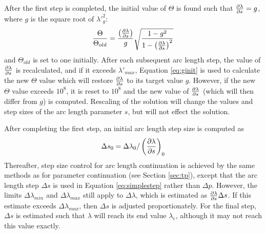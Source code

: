After the first step is completed, the initial value of $\Theta$ is found such that $\frac{\partial \lambda}{\partial s} = g$, where $g$ is the square root of $\lambda'^2_g$:
\begin{equation}
\label{eq:ginit}
{{\Theta}\over {\Theta_{old}}} = {{\left( \frac{\partial \lambda}{\partial s} \right)}\over {g}} \sqrt{{1 - g^2}\over {1 - \left( \frac{\partial \lambda}{\partial s} \right)^2}}
\end{equation}
and $\Theta_{old}$ is set to one initially. After each subsequent arc length step, the value of $\frac{\partial \lambda}{\partial s}$ is recalculated, and if it exceeds $\lambda'_{max}$, Equation \ref{eq:ginit} is used to calculate the new $\Theta$ value which will restore $\frac{\partial \lambda}{\partial s}$ to its target value $g$. However, if the new $\Theta$ value exceeds $10^8$, it is reset to $10^8$ and the new value of $\frac{\partial \lambda}{\partial s}$ (which will then differ from $g$) is computed. Rescaling of the solution will change the values and step sizes of the arc length parameter $s$, but will not effect the solution.

After completing the first step, an initial arc length step size is computed as
\begin{equation}
\label{eq:sinit}
\Delta s_0 = \Delta \lambda_0 / \left( \frac{\partial \lambda}{\partial s} \right)_0
\end{equation}
Thereafter, step size control for arc length continuation is achieved by the same methods as for parameter continuation (see Section \ref{sec:tp}), except that the arc length step $\Delta s$ is used in Equation \ref{eq:simplestep} rather than $\Delta p$. However, the limits $\Delta \lambda_{min}$ and $\Delta \lambda_{max}$ still apply to $\Delta \lambda$, which is estimated as $\frac{\partial \lambda}{\partial s} \Delta s$. If this estimate exceeds $\Delta \lambda_{max}$, then $\Delta s$ is adjusted proportionately. For the final step, $\Delta s$ is estimated such that $\lambda$ will reach its end value $\lambda_e$, although it may not reach this value exactly.

